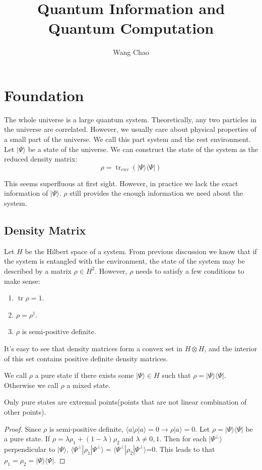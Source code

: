\documentclass[12pt]{book}
\title{Quantum Information and Quantum Computation}
\author{Wang Chao}
\DeclareMathOperator{\tr}{tr}
\begin{document}
 

\maketitle 
\tableofcontents

\chapter{Foundation}

The whole universe is a large quantum system. Theoretically, any two particles in the universe are correlated. However, we usually care about physical properties of a small part of the universe. We call this part system and the rest environment. Let $|\Psi\rangle$ be a state of the universe. We can construct the state of the system as the reduced density matrix:
\begin{equation}
	\rho=\tr_{env}(|\Psi\rangle\langle\Psi|)
\end{equation}

This seems superfluous at first sight. However, in practice we lack the exact information of $|\Psi\rangle$. $\rho$ still provides the enough information we need about the system.
\section{Density Matrix}

Let $H$ be the Hilbert space of a system. From previous discussion we know that if the system is entangled with the environment, the state of the system may be described by a matrix $\rho\in H^2$. However, $\rho$ needs to satisfy a few conditions to make sense:
\begin{enumerate}
	\item $\tr\rho=1$.
	\item $\rho=\rho^\dagger$.
	\item $\rho$ is semi-positive definite.
\end{enumerate}

It's easy to see that density matrices form a convex set in $H\otimes H$, and the interior of this set contains positive definite density matrices.
\begin{definition}
	We call $\rho$ a pure state if there exists some $|\Psi\rangle\in H$ such that $\rho=|\Psi\rangle\langle\Psi|$. Otherwise we call $\rho$ a mixed state.
\end{definition}

\begin{lemma}
	Only pure states are extremal points(points that are not linear combination of other points).
\end{lemma}
\begin{proof}
	Since $\rho$ is semi-positive definite, $\langle a|\rho|a\rangle=0\rightarrow\rho|a\rangle=0$. Let $\rho=|\Psi\rangle\langle\Psi|$ be a pure state. If $\rho=\lambda\rho_1+(1-\lambda)\rho_2$ and $\lambda\neq0,1$. Then for each $|\Psi^\perp\rangle$ perpendicular to $|\Psi\rangle$, $\langle \Psi^\perp|\rho_1|\Psi^\perp\rangle=\langle \Psi^\perp|\rho_2|\Psi^\perp\rangle$=0. This leads to that $\rho_1=\rho_2=|\Psi\rangle\langle\Psi|$.
\end{proof}
\end{document}
